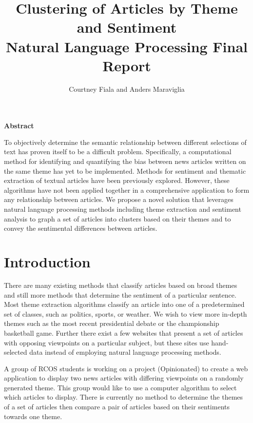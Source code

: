 \documentclass[12pt]{article}
\begin{document}
\title{Clustering of Articles by Theme and Sentiment \\ {\Large Natural Language Processing Final Report}}
\author{Courtney Fiala and Anders Maraviglia}

\maketitle

\begin{center}\textbf{Abstract}\end{center}
To objectively determine the semantic relationship between different selections of text has proven itself to be a difficult problem. Specifically, a computational method for identifying and quantifying the bias between news articles written on the same theme has yet to be implemented. Methods for sentiment and thematic extraction of textual articles have been previously explored. However, these algorithms have not been applied together in a comprehensive application to form any relationship between articles. We propose a novel solution that leverages natural language processing methods including theme extraction and sentiment analysis to graph a set of articles into clusters based on their themes and to convey the sentimental differences between articles.

\section{Introduction}
There are many existing methods that classify articles based on broad themes and still more methods that determine the sentiment of a particular sentence. Most theme extraction algorithms classify an article into one of a predetermined set of classes, such as politics, sports, or weather. We wish to view more in-depth themes such as the most recent presidential debate or the championship basketball game. Further there exist a few websites that present a set of articles with opposing viewpoints on a particular subject, but these sites use hand-selected data instead of employing natural language processing methods.

A group of RCOS students is working on a project (Opinionated) to create a web application to display two news articles with differing viewpoints on a randomly generated theme. This group would like to use a computer algorithm to select which articles to display. There is currently no method to determine the themes of a set of articles then compare a pair of articles based on their sentiments towards one theme.
\end{document}
